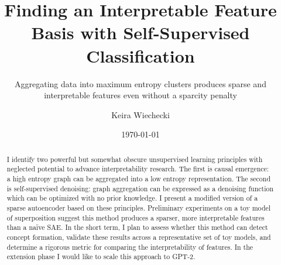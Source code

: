 \documentclass{article}
\date{\today}
\title{Finding an Interpretable Feature Basis with Self-Supervised Classification}
\subtitle{Aggregating data into maximum entropy clusters produces sparse and interpretable features 
even without a sparcity penalty}
\author[1]{Keira Wiechecki}
\affil[1]{Center for Genomics \& Systems Biology, New York University,
  \texttt{kaw504@nyu.edu}}
\begin{document}
\maketitle


\begin{abstract}
I identify two powerful but somewhat obscure unsupervised learning principles with neglected potential
to advance interpretability research.
The first is causal emergence:
a high entropy graph can be aggregated into a low entropy representation.
The second is self-supervised denoising:
graph aggregation can be expressed as a denoising function which can be optimized with no prior knowledge.  
I present a modified version of a sparse autoencoder based on these principles.
  Preliminary experiments on a toy model of superposition suggest this method produces a sparser, 
  more interpretable features than a na\"ive SAE. 
In the short term, I plan to assess whether this method can detect concept formation, validate these results across a representative set of toy models,
  and determine a rigorous metric for comparing the interpretability of features.
  In the extension phase I would like to scale this approach to GPT-2.
  
  
  
\end{abstract}
\end{document}

